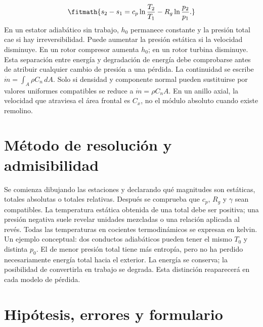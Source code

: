\documentclass[10pt,openany]{book}
\begin{document}
\[
\fitmath{s_2-s_1=c_p\ln\frac{T_2}{T_1}-R_g\ln\frac{p_2}{p_1}.}
\]
En un estator adiabático sin trabajo, \(h_0\) permanece constante y la presión total cae si hay irreversibilidad. Puede aumentar la presión estática si la velocidad disminuye. En un rotor compresor aumenta \(h_0\); en un rotor turbina disminuye. Esta separación entre energía y degradación de energía debe comprobarse antes de atribuir cualquier cambio de presión a una pérdida.
La continuidad se escribe \(\dot m=\int_A\rho C_n\,dA\). Solo si densidad y componente normal pueden sustituirse por valores uniformes compatibles se reduce a \(\dot m=\rho C_n A\). En un anillo axial, la velocidad que atraviesa el área frontal es \(C_x\), no el módulo absoluto cuando existe remolino.

\section{Método de resolución y admisibilidad}

Se comienza dibujando las estaciones y declarando qué magnitudes son estáticas, totales absolutas o totales relativas. Después se comprueba que \(c_p\), \(R_g\) y \(\gamma\) sean compatibles. La temperatura estática obtenida de una total debe ser positiva; una presión negativa suele revelar unidades mezcladas o una relación aplicada al revés. Todas las temperaturas en cocientes termodinámicos se expresan en kelvin.
Un ejemplo conceptual: dos conductos adiabáticos pueden tener el mismo \(T_0\) y distinta \(p_0\). El de menor presión total tiene más entropía, pero no ha perdido necesariamente energía total hacia el exterior. La energía se conserva; la posibilidad de convertirla en trabajo se degrada. Esta distinción reaparecerá en cada modelo de pérdida.

\section{Hipótesis, errores y formulario}
\end{document}

